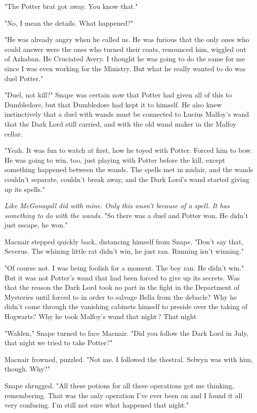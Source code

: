 "The Potter brat got away. You know that."

"No, I mean the details. What happened?"

"He was already angry when he called us. He was furious that the only ones who could answer were the ones who turned their coats, renounced him, wiggled out of Azkaban. He Cruciated Avery. I thought he was going to do the same for me since I was even working for the Ministry. But what he really wanted to do was duel Potter."

"Duel, not kill?" Snape was certain now that Potter had given all of this to Dumbledore, but that Dumbledore had kept it to himself. He also knew instinctively that a duel with wands must be connected to Lucius Malfoy's wand that the Dark Lord still carried, and with the old wand maker in the Malfoy cellar.

"Yeah. It was fun to watch at first, how he toyed with Potter. Forced him to bow. He was going to win, too, just playing with Potter before the kill, except something happened between the wands. The spells met in midair, and the wands couldn't separate, couldn't break away, and the Dark Lord's wand started giving up its spells."

\emph{Like McGonagall did with mine. Only this wasn't because of a spell. It has something to do with the wands.} "So there was a duel and Potter won. He didn't just escape, he won."

Macnair stepped quickly back, distancing himself from Snape. "Don't say that, Severus. The whining little rat didn't win, he just ran. Running isn't winning."

"Of course not. I was being foolish for a moment. The boy ran. He didn't win." But it was not Potter's wand that had been forced to give up its secrets. Was that the reason the Dark Lord took no part in the fight in the Department of Mysteries until forced to in order to salvage Bella from the debacle? Why he didn't come through the vanishing cabinets himself to preside over the taking of Hogwarts? Why he took Malfoy's wand that night{\el}\,? That night{\el}

"Walden," Snape turned to face Macnair. "Did you follow the Dark Lord in July, that night we tried to take Potter?"

Macnair frowned, puzzled. "Not me. I followed the thestral. Selwyn was with him, though. Why?"

Snape shrugged. "All these potions for all these operations got me thinking, remembering. That was the only operation I've ever been on and I found it all very confusing. I'm still not sure what happened that night."


